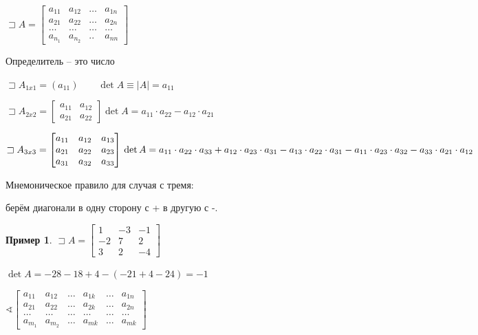 \documentclass{book}
\theoremstyle{definition}
\newtheorem*{example}{Пример}
\begin{document}
    $\sqsupset A = \begin{bmatrix} a_{11}&a_{12}&\ldots & a_{1n}\\ a_{21} & a_{22} & \ldots & a_{2n}\\ \ldots &\ldots &\ldots & \ldots\\ a_{n_1} & a_{n_2} & .. & a_{nn} \end{bmatrix}  $
    \begin{definition}
        Определитель -- это число

        $\sqsupset A_{1x 1} = (a_{11})\qquad \det A \equiv \left| A \right| = a_{11}$

        $\sqsupset A_{2x 2} = \begin{bmatrix} a_{11} & a_{12}\\ a_{21} & a_{22} \end{bmatrix} \det A = a_{11}\cdot a_{22}-a_{12}\cdot a_{21} $

        $\sqsupset A_{3x 3} = \begin{bmatrix} a_{11} & a_{12} & a_{13} \\ a_{21} & a_{22} & a_{23}\\ a_{31} & a_{32} & a_{33} \end{bmatrix}  \quad \\ \det A = a_{11}\cdot a_{22}\cdot a_{33}+a_{12}\cdot a_{23}\cdot a_{31} - a_{13}\cdot a_{22}\cdot a_{31}-a_{11}\cdot a_{23}\cdot a_{32} - a_{33}\cdot a_{21}\cdot a_{12}$

        Мнемоническое правило для случая с тремя: 

        берём диагонали в одну сторону с + в другую с -.
    \end{definition}
    \begin{example}
        $\sqsupset A = \begin{bmatrix} 1 & -3 & -1\\ -2 & 7 & 2 \\ 3 & 2 & -4 \end{bmatrix} $ 

        $\det A = -28-18+4 - \left( -21 +4 -24 \right) = -1 $
    \end{example}

    $\sphericalangle \begin{bmatrix} a_{11} & a_{12} & \ldots & a_{1k} & \ldots & a_{1n}\\ a_{21} & a_{22} & \ldots & a_{2k} & \ldots & a_{2n}\\ \ldots & \ldots & \ldots & \ldots & \ldots & \ldots \\ a_{m_1} & a_{m_2} & \ldots & a_{mk} & \ldots & a_{m k} \end{bmatrix} $ 
\end{document}
